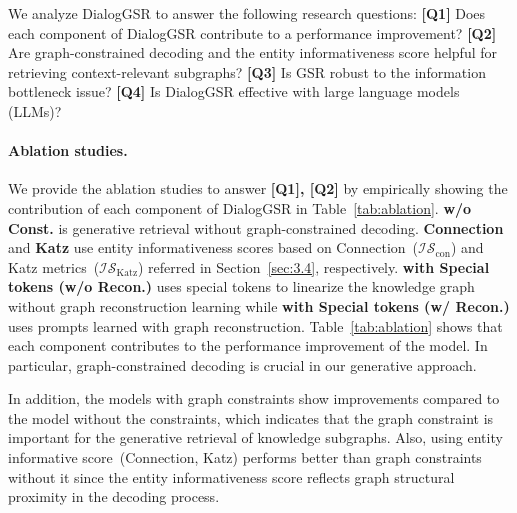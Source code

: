 



We analyze DialogGSR to answer the following research questions: 
\textbf{[Q1]} Does each component of DialogGSR contribute to a performance improvement? 
\textbf{[Q2]} Are graph-constrained decoding and the entity informativeness score helpful for retrieving context-relevant subgraphs?
\textbf{[Q3]} Is GSR robust to the information bottleneck issue?
\textbf{[Q4]} Is DialogGSR effective with large language models (LLMs)?

\paragraph{Ablation studies.}
We provide the ablation studies to answer \textbf{[Q1], [Q2]} by empirically showing the contribution of each component of DialogGSR in Table~\ref{tab:ablation}.
\textbf{w/o Const.} is generative retrieval without graph-constrained decoding. 
\textbf{Connection} and \textbf{Katz} use entity informativeness scores based on Connection~($\mathcal{IS}_{\text{con}}$) and Katz metrics~($\mathcal{IS}_{\text{Katz}}$) referred in Section~\ref{sec:3.4}, respectively.
\textbf{with Special tokens (w/o Recon.)} uses special tokens to linearize the knowledge graph without graph reconstruction learning while \textbf{with Special tokens (w/ Recon.)} uses prompts learned with graph reconstruction.
Table~\ref{tab:ablation} shows that each component contributes to the performance improvement of the model.
In particular, graph-constrained decoding is crucial in our generative approach.

In addition, the models with graph constraints show improvements compared to the model without the constraints, which indicates that the graph constraint is important for the generative retrieval of knowledge subgraphs.
Also, using entity informative score~(Connection, Katz) performs better than graph constraints without it since the entity informativeness score reflects graph structural proximity in the decoding process.



